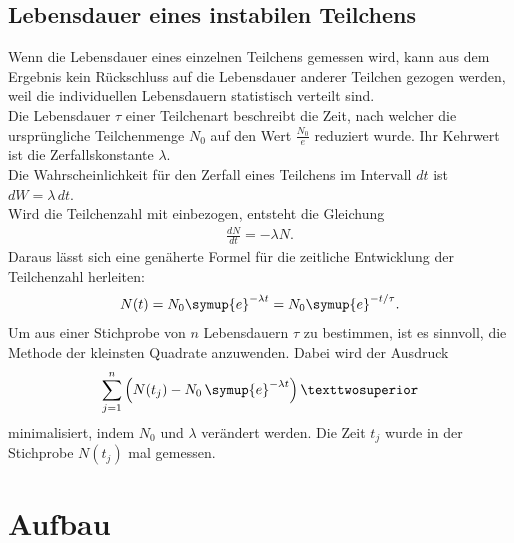     \subsection{Lebensdauer eines instabilen Teilchens}

    Wenn die Lebensdauer eines einzelnen Teilchens gemessen wird,
    kann aus dem Ergebnis kein Rückschluss auf die Lebensdauer
    anderer Teilchen gezogen werden, weil die individuellen Lebensdauern
    statistisch verteilt sind. \\
    Die Lebensdauer $\tau$ einer Teilchenart beschreibt die Zeit, nach welcher
    die ursprüngliche Teilchenmenge $N_0$ auf den Wert $\frac{N_0}e$ reduziert
    wurde. Ihr Kehrwert ist die Zerfallskonstante $\lambda.$\\
    Die Wahrscheinlichkeit für den Zerfall eines Teilchens im Intervall $dt$ ist
    $dW=\lambda\,dt.$\\
    Wird die Teilchenzahl mit einbezogen, entsteht die Gleichung
    \begin{align*}
      \frac{dN}{dt}=-\lambda N.
    \end{align*}
    Daraus lässt sich eine genäherte Formel für die zeitliche Entwicklung der
    Teilchenzahl herleiten:
    \begin{align*}
      N(t)=N_0\symup{e}^{-\lambda t}=N_0\symup{e}^{-t/\tau}.
    \end{align*}
    Um aus einer Stichprobe von $n$ Lebensdauern $\tau$ zu bestimmen,
    ist es sinnvoll, die Methode der kleinsten Quadrate anzuwenden.
    Dabei wird der Ausdruck
    \begin{align*}
      \sum_{j=1}^n \left(N(t_j)-N_0\,\symup{e}^{-\lambda t}\right)²
    \end{align*}
    minimalisiert, indem $N_0$ und $\lambda$ verändert werden.
    Die Zeit $t_j$ wurde in der Stichprobe $N(t_j)$ mal gemessen.



  \section{Aufbau}

